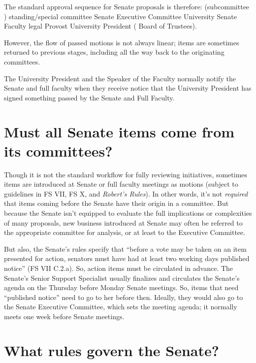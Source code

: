 \documentclass[12pt]{article}
\begin{document}
The standard approval sequence for Senate proposals is therefore:
(subcommittee \rightarrow{} ) standing/special committee \rightarrow{}
Senate Executive Committee \rightarrow{} University Senate \rightarrow{}
Faculty \rightarrow{} legal \rightarrow{} Provost \rightarrow{}
University President ( \rightarrow{} Board of Trustees).

However, the flow of passed motions is not always linear; items are
sometimes returned to previous stages, including all the way back to the
originating committees.

The University President and the Speaker of the Faculty normally notify
the Senate and full faculty when they receive notice that the University
President has signed something passed by the Senate and Full Faculty.

\section{Must all Senate items come from its
committees?}\label{must-all-senate-items-come-from-its-committees}

Though it is not the standard workflow for fully reviewing initiatives,
sometimes items are introduced at Senate or full faculty meetings as
motions (subject to guidelines in FS VII, FS X, and \emph{Robert's
Rules}). In other words, it's not \emph{required} that items coming
before the Senate have their origin in a committee. But because the
Senate isn't equipped to evaluate the full implications or complexities
of many proposals, new business introduced at Senate may often be
referred to the appropriate committee for analysis, or at least to the
Executive Committee.

But also, the Senate's rules specify that ``before a vote may be taken
on an item presented for action, senators must have had at least two
working days published notice'' (FS VII C.2.a). So, action items must be
circulated in advance. The Senate's Senior Support Specialist usually
finalizes and circulates the Senate's agenda on the Thursday before
Monday Senate meetings. So, items that need ``published notice'' need to
go to her before then. Ideally, they would also go to the Senate
Executive Committee, which sets the meeting agenda; it normally meets
one week before Senate meetings.

\section{What rules govern the
Senate?}\label{what-rules-govern-the-senate}
\end{document}
